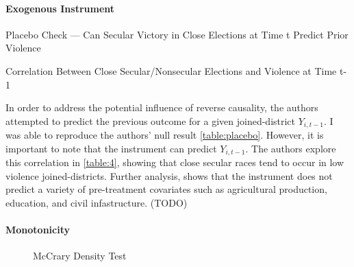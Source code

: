 \documentclass{scrartcl}
\begin{document}
\paragraph{Exogenous Instrument} \label{exo}
\begin{table}[ht]
  \begin{center}
    \scalebox{0.75}{
      
    }
    \caption{Placebo Check — Can Secular Victory in Close Elections at Time t Predict Prior Violence}
    \label{table:placebo}
  \end{center}
\end{table}
\begin{table}[ht]
  \begin{center}
    \scalebox{0.75}{
      
    }
    \caption{Correlation Between Close Secular/Nonsecular Elections and Violence at Time t-1}
    \label{table:4}
  \end{center}
\end{table}

In order to address the potential influence of reverse causality, the authors attempted to predict the previous outcome for a given joined-district $Y_{i,t-1}$.
I was able to reproduce the authors' null result \ref{table:placebo}.
However, it is important to note that the instrument can predict $Y_{i,t-1}$.
The authors explore this correlation in \ref{table:4}, showing that close secular races tend to occur in low violence joined-districts.
Further analysis, shows that the instrument does not predict a variety of pre-treatment covariates such as agricultural production, education, and civil infastructure. (TODO)

\paragraph{Monotonicity}

\begin{figure}[h]
  \centering
  \caption{McCrary Density Test}
  \label{fig:density}
\end{figure}
\end{document}
